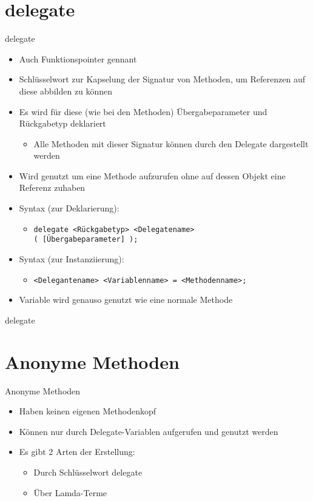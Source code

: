 \section{delegate}
\begin{frame}{delegate}
	\begin{itemize}
		\item Auch Funktionspointer gennant
		\item Schlüsselwort zur Kapselung der Signatur von Methoden, um Referenzen auf diese abbilden zu können
		\item Es wird für diese (wie bei den Methoden) Übergabeparameter und Rückgabetyp deklariert
			\begin{itemize}
				\item Alle Methoden mit dieser Signatur können durch den Delegate dargestellt werden
			\end{itemize}
		\item Wird genutzt um eine Methode aufzurufen ohne auf dessen Objekt eine Referenz zuhaben
		\item Syntax (zur Deklarierung):
		\begin{itemize}
			\item \texttt{delegate \alert{<Rückgabetyp> <Delegatename>}\\( \alert{[Übergabeparameter]} );}
		\end{itemize}
		\item Syntax (zur Instanziierung):
		\begin{itemize}
			\item \texttt{\alert{<Delegantename> <Variablenname>} = \alert{<Methodenname>};}
		\end{itemize}
		\item Variable wird genauso genutzt wie eine normale Methode
	\end{itemize}
\end{frame}

\begin{frame}{delegate}
	
	
\end{frame}

\section{Anonyme Methoden}
\begin{frame}{Anonyme Methoden}
	\begin{itemize}
		\item Haben keinen eigenen Methodenkopf
		\item Können nur durch Delegate-Variablen aufgerufen und genutzt werden
		\item Es gibt 2 Arten der Erstellung:
		\begin{itemize}
			\item Durch Schlüsselwort \alert{delegate}
			\item Über Lamda-Terme
		\end{itemize}	
	\end{itemize}
\end{frame}

